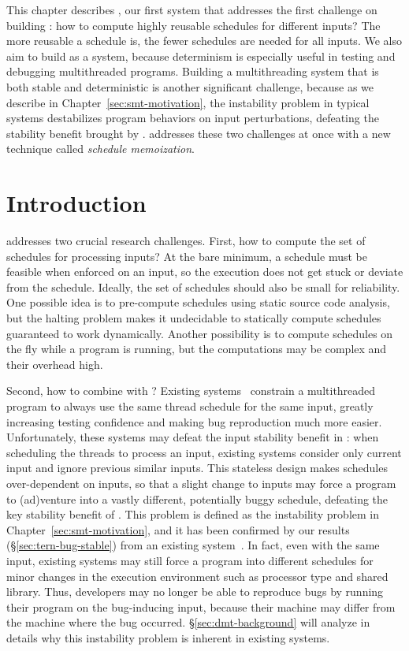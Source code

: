 This chapter describes \tern, our first \smt system that
addresses the first challenge on building \smt: how to compute highly reusable
schedules for different inputs? The more reusable a schedule is, the fewer
schedules are needed for all inputs. We also aim to build \tern as a \dmt 
system, because determinism is especially useful in testing and debugging 
multithreaded programs. Building a multithreading system that is both stable 
and deterministic is another significant challenge, because as we describe in 
Chapter~\ref{sec:smt-motivation}, the instability problem in typical \dmt 
systems destabilizes program behaviors on input perturbations,
defeating the stability benefit brought by \smt. \tern addresses these two 
challenges at once with a new technique called \emph{schedule memoization}.


\section{Introduction} \label{sec:tern-overview}

\tern addresses two crucial research challenges. First, how to compute the set
of schedules for processing inputs?  At the bare minimum, a schedule must be
feasible when enforced on an input, so the execution does not get stuck or
deviate from the schedule.  Ideally, the set of schedules should also be small
for reliability.  One possible idea is to pre-compute schedules using static
source code analysis, but the halting problem makes it undecidable to
statically compute schedules guaranteed to work dynamically.  Another
possibility is to compute schedules on the fly while a program is running,
but the computations may be complex and their overhead high.

Second, how to combine \dmt with \smt? Existing \dmt
systems~\cite{dmp:asplos09,coredet:asplos10,kendo:asplos09} constrain a
multithreaded program to always use the same thread schedule for the same input,
greatly increasing testing confidence and making bug reproduction much more
easier. Unfortunately, these \dmt systems may defeat the input stability
benefit in \smt: when scheduling the threads to process an
input, existing \dmt systems consider only current input and ignore previous
similar inputs.  This stateless design makes schedules over-dependent on inputs,
so that a slight change to inputs may force a program to (ad)venture into a
vastly different, potentially buggy schedule, defeating the key stability
benefit of \smt.  This problem is defined as the instability problem in 
Chapter~\ref{sec:smt-motivation}, and it has been
confirmed by our results (\S\ref{sec:tern-bug-stable}) from an existing \dmt
system~\cite{coredet:asplos10}. In fact, even with the same 
input, existing \dmt systems may still force a program into different schedules 
for minor changes in the execution environment such as processor type and 
shared library.  Thus, developers may no longer be able to reproduce bugs by 
running their program on the bug-inducing input, because their machine may 
differ from the machine where the bug occurred. \S\ref{sec:dmt-background} will 
analyze in details why this instability problem is inherent in existing \dmt 
systems.

